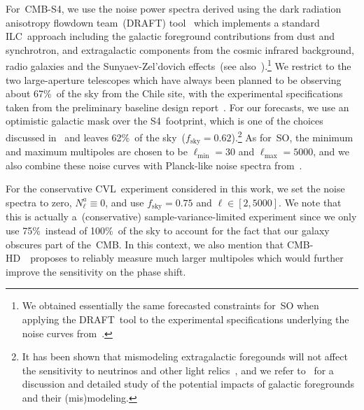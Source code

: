 \documentclass[11pt]{article}
\numberwithin{equation}{section}
\begin{document}
For~\mbox{CMB-S4}, we use the noise power spectra derived using the dark radiation anisotropy flowdown team~(DRAFT) tool~\cite{CMB-S4:inprep, Raghunathan:draft} which implements a standard ILC~approach including the galactic foreground contributions from dust and synchrotron, and extragalactic components from the cosmic infrared background, radio galaxies and the Sunyaev-Zel'dovich effects~(see also~\cite{Raghunathan:2023yfe}).\footnote{We obtained essentially the same forecasted constraints for~SO when applying the DRAFT~tool to the experimental specifications underlying the noise curves from~\cite{SimonsObservatory:2020noise}.} We restrict to the two large-aperture telescopes which have always been planned to be observing about 67\%~of the sky from the Chile site, with the experimental specifications taken from the preliminary baseline design report~\cite{CMB-S4:pbdr}. For our forecasts, we use an optimistic galactic mask over the S4~footprint, which is one of the choices discussed in~\cite{CMB-S4:inprep, Raghunathan:inprep} and leaves 62\%~of the sky~($f_\mathrm{sky} = 0.62$).\footnote{It has been shown that mismodeling extragalactic foregounds will not affect the sensitivity to neutrinos and other light relics~\cite{Raghunathan:2023yfe}, and we refer to~\cite{CMB-S4:inprep, Raghunathan:inprep} for a discussion and detailed study of the potential impacts of galactic foregrounds and their (mis)modeling.} As for~SO, the minimum and maximum multipoles are chosen to be $\ell_\mathrm{min} = 30$ and $\ell_\mathrm{max} = 5000$, and we also combine these noise curves with Planck-like noise spectra from~\cite{Allison:2015qca}.

For the conservative CVL~experiment considered in this work, we set the noise spectra to zero, $N_\ell^a \equiv 0$, and use $f_\mathrm{sky} = 0.75$ and $\ell \in [2, 5000]$. We note that this is actually a~(conservative) sample-variance-limited experiment since we only use 75\%~instead of 100\%~of the sky to account for the fact that our galaxy obscures part of the~CMB. In this context, we also mention that \mbox{CMB-HD}~\cite{CMB-HD:2022bsz}~proposes to reliably measure much larger multipoles which would further improve the sensitivity on the phase shift.\medskip
\end{document}
